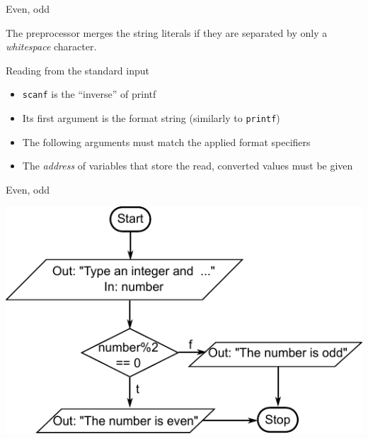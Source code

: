 \documentclass[usenames,dvipsnames,aspectratio=169]{beamer}
\newcommand{\kiemel}[1]{{\color{kiemelesszin}#1}}
\begin{document}
\begin{frame}{Even, odd}
  \begin{exampleblock}{}
    \footnotesize
    
  \end{exampleblock}
  The preprocessor merges the string literals if they are separated by only a \emph{whitespace} character.
  \begin{exampleblock}{}
    \footnotesize
    
  \end{exampleblock}
  Reading from the standard input
  \begin{itemize}
    \item \texttt{\kiemel{scanf}} is the ``inverse'' of printf
    \item Its first argument is the format string (similarly to \texttt{printf})
    \item The following arguments must match the applied format specifiers
    \item The \emph{address} of variables that store the read, converted values must be given
  \end{itemize}
\end{frame}

\begin{frame}{Even, odd}
  \begin{center}
    \includegraphics[]{even2.pdf}
  \end{center}
\end{frame}
\end{document}
